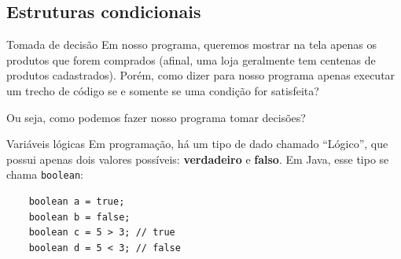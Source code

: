 \documentclass{beamer}
\begin{document}
\subsection{Estruturas condicionais}

\begin{frame}{Tomada de decisão}
    Em nosso programa, queremos mostrar na tela apenas os produtos que forem
    comprados (afinal, uma loja geralmente tem centenas de produtos
    cadastrados). Porém, como dizer para nosso programa apenas executar um
    trecho de código se e somente se uma condição for satisfeita?

    Ou seja, como podemos fazer nosso programa tomar decisões?
\end{frame}

\begin{frame}[fragile]{Variáveis lógicas}
    Em programação, há um tipo de dado chamado ``Lógico'', que possui apenas dois
    valores possíveis: \textbf{verdadeiro} e \textbf{falso}. Em Java, esse tipo
    se chama \texttt{boolean}:

    \begin{verbatim}
    boolean a = true;
    boolean b = false;
    boolean c = 5 > 3; // true
    boolean d = 5 < 3; // false
    \end{verbatim}
\end{frame}
\end{document}
